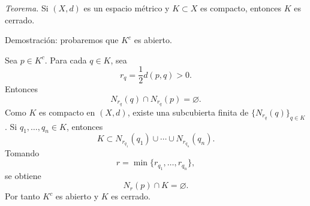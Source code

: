 \documentclass[12pt]{article}
\begin{document}
\textit{Teorema.} Si $(X,d)$ es un espacio métrico y $K\subset X$ es compacto, entonces $K$ es cerrado.

Demostración: probaremos que $K^c$ es abierto.

Sea $p\in K^c$. Para cada $q\in K$, sea
\[
r_q=\frac12 d(p,q)>0.
\]
Entonces
\[
N_{r_q}(q)\cap N_{r_q}(p)=\varnothing.
\]
Como $K$ es compacto en $(X,d)$, existe una subcubierta finita de $\{N_{r_q}(q)\}_{q\in K}$.
Si $q_1,\dots,q_n\in K$, entonces
\[
K\subset N_{r_{q_1}}(q_1)\cup\cdots\cup N_{r_{q_n}}(q_n).
\]
Tomando
\[
r=\min\{r_{q_1},\dots,r_{q_n}\},
\]
se obtiene
\[
N_r(p)\cap K=\varnothing.
\]
Por tanto $K^c$ es abierto y $K$ es cerrado.
\end{document}
